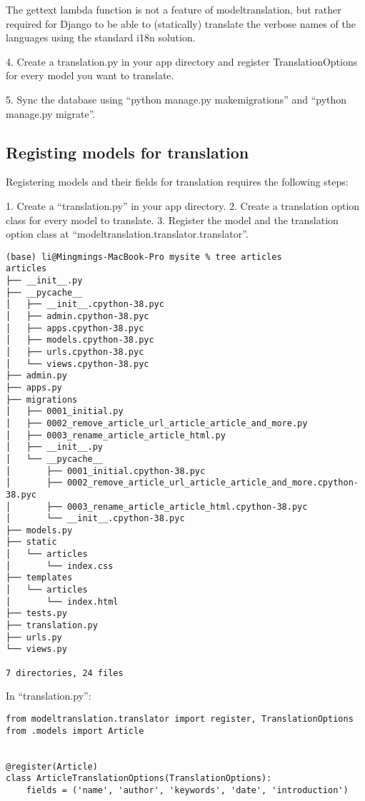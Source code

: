 \begin{tcolorbox}
The gettext lambda function is not a feature of modeltranslation, but rather required for Django to be able to (statically) translate the verbose names of the languages using the standard i18n solution.
\end{tcolorbox}




4. Create a translation.py in your app directory and register TranslationOptions for every model you want to translate.

5. Sync the database using ``python manage.py makemigrations'' and ``python manage.py migrate''.


\subsection{Registing models for translation}

Registering models and their fields for translation requires the following steps:

1. Create a ``translation.py'' in your app directory.
2. Create a translation option class for every model to translate.
3. Register the model and the translation option class at ``modeltranslation.translator.translator''.

\begin{lstlisting}
(base) li@Mingmings-MacBook-Pro mysite % tree articles 
articles
├── __init__.py
├── __pycache__
│   ├── __init__.cpython-38.pyc
│   ├── admin.cpython-38.pyc
│   ├── apps.cpython-38.pyc
│   ├── models.cpython-38.pyc
│   ├── urls.cpython-38.pyc
│   └── views.cpython-38.pyc
├── admin.py
├── apps.py
├── migrations
│   ├── 0001_initial.py
│   ├── 0002_remove_article_url_article_article_and_more.py
│   ├── 0003_rename_article_article_html.py
│   ├── __init__.py
│   └── __pycache__
│       ├── 0001_initial.cpython-38.pyc
│       ├── 0002_remove_article_url_article_article_and_more.cpython-38.pyc
│       ├── 0003_rename_article_article_html.cpython-38.pyc
│       └── __init__.cpython-38.pyc
├── models.py
├── static
│   └── articles
│       └── index.css
├── templates
│   └── articles
│       └── index.html
├── tests.py
├── translation.py
├── urls.py
└── views.py

7 directories, 24 files  
\end{lstlisting}


In ``translation.py'':
\begin{lstlisting}
from modeltranslation.translator import register, TranslationOptions
from .models import Article


@register(Article)
class ArticleTranslationOptions(TranslationOptions):
    fields = ('name', 'author', 'keywords', 'date', 'introduction')

\end{lstlisting}

